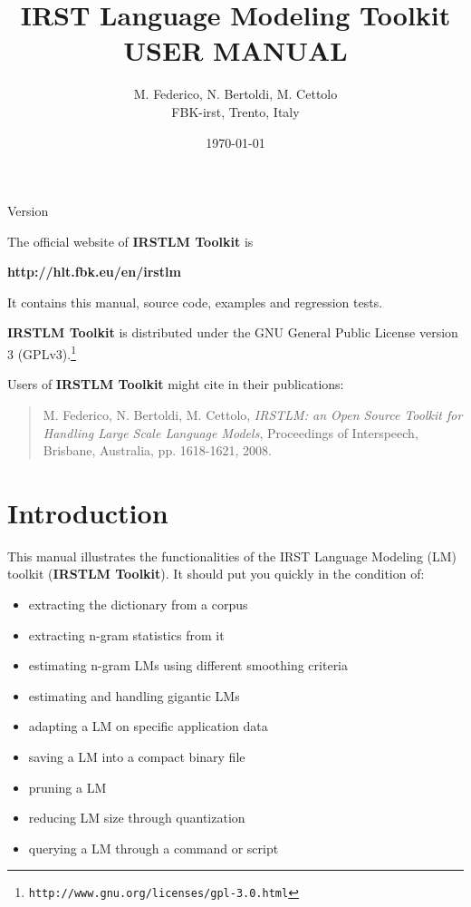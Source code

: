 \documentclass[11pt]{article}
\newcommand{\IRSTLM}{{\bf IRSTLM Toolkit}}
\newcommand*{\MyPath}{../}
\newcommand{\versionnumber}{}
\begin{document}
   

\title{IRST Language Modeling Toolkit \\USER MANUAL}
			         
\author{M. Federico, N. Bertoldi, M. Cettolo\\FBK-irst, Trento, Italy}			       
\date{\today}
 
\maketitle
\centerline{Version \versionnumber}

\vspace*{3cm}
\noindent
The official website of {\IRSTLM} is

\bigskip

{\bf http://hlt.fbk.eu/en/irstlm}

\bigskip
\noindent It contains this manual, source code, examples and regression tests.

\vspace*{1cm}
\noindent
{\IRSTLM} is distributed under the GNU General Public License version 3 (GPLv3).\footnote{\tt http://www.gnu.org/licenses/gpl-3.0.html}

\vspace*{1cm}
\noindent
Users of {\IRSTLM}  might cite in their publications:
\begin{quote}
M. Federico,  N. Bertoldi,  M. Cettolo, {\em IRSTLM: an Open Source Toolkit for Handling Large Scale Language Models}, Proceedings of Interspeech, Brisbane, Australia, pp. 1618-1621, 2008.
\end{quote}



\newpage
\setcounter{tocdepth}{1}  
\tableofcontents


\newpage
\section{Introduction}

This manual illustrates the functionalities of  the IRST Language  Modeling (LM)  toolkit ({\IRSTLM}). It  should  
put you quickly  in  the condition of:
\begin{itemize}
\item extracting the dictionary from a corpus
\item extracting n-gram statistics from it
\item estimating n-gram LMs using different smoothing criteria
\item estimating and handling gigantic LMs
\item adapting a LM on specific application data
\item saving a  LM into a compact binary file
\item pruning a LM
\item reducing LM size through quantization
\item querying a LM through a command or script
\end{itemize}
\end{document}
